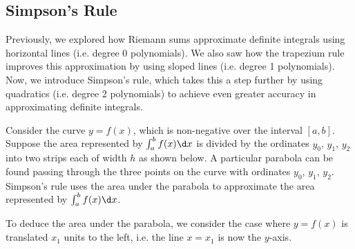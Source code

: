 \subsection{Simpson's Rule}

Previously, we explored how Riemann sums approximate definite integrals using horizontal lines (i.e. degree 0 polynomials). We also saw how the trapezium rule improves this approximation by using sloped lines (i.e. degree 1 polynomials). Now, we introduce Simpson's rule, which takes this a step further by using quadratics (i.e. degree 2 polynomials) to achieve even greater accuracy in approximating definite integrals.

Consider the curve $y = f(x)$, which is non-negative over the interval $[a, b]$. Suppose the area represented by $\int_a^b f(x) \d x$ is divided by the ordinates $y_0$, $y_1$, $y_2$ into two strips each of width $h$ as shown below. A particular parabola can be found passing through the three points on the curve with ordinates $y_0$, $y_1$, $y_2$. Simpson's rule uses the area under the parabola to approximate the area represented by $\int_a^b f(x) \d x$.

To deduce the area under the parabola, we consider the case where $y = f(x)$ is translated $x_1$ units to the left, i.e. the line $x = x_1$ is now the $y$-axis. 

\begin{figure}[H]
    \centering
    \caption{}
\end{figure}


